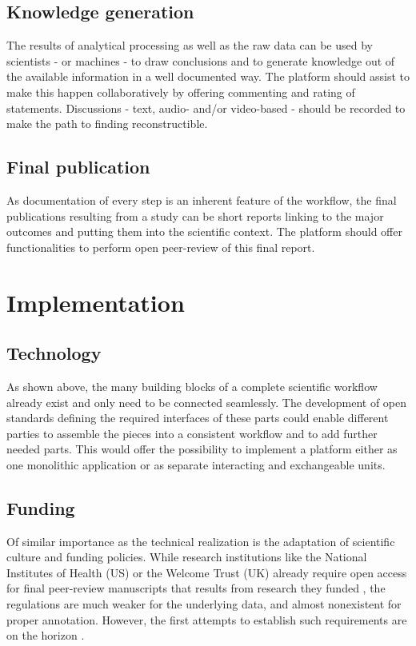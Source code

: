 \documentclass{llncs}
\begin{document}
\subsection{Knowledge generation}

The results of analytical processing as well as the raw data can be
used by scientists - or machines \cite{Schmidt} - to draw conclusions
and to generate knowledge out of the available information in a well
documented way. The platform should assist to make this happen
collaboratively by offering commenting and rating of
statements. Discussions - text, audio- and/or video-based - should be
recorded to make the path to finding reconstructible.

\subsection{Final publication}

As documentation of every step is an inherent feature of the workflow,
the final publications resulting from a study can be short reports
linking to the major outcomes and putting them into the scientific
context. The platform should offer functionalities to perform open
peer-review of this final report.

\section{Implementation}

\subsection{Technology}

As shown above, the many building blocks of a complete scientific
workflow already exist and only need to be connected seamlessly. The
development of open standards defining the required interfaces of
these parts could enable different parties to assemble the pieces into
a consistent workflow and to add further needed parts. This would
offer the possibility to implement a platform either as one monolithic
application or as separate interacting and exchangeable units.

\subsection{Funding}

Of similar importance as the technical realization is the adaptation
of scientific culture and funding policies. While research
institutions like the National Institutes of Health (US) or the
Welcome Trust (UK) already require open access for final peer-review
manuscripts that results from research they funded
\cite{NIH,WelcomeTrust}, the regulations are much weaker for the
underlying data, and almost nonexistent for proper
annotation. However, the first attempts to establish such requirements
are on the horizon \cite{Vickers}.
\end{document}
